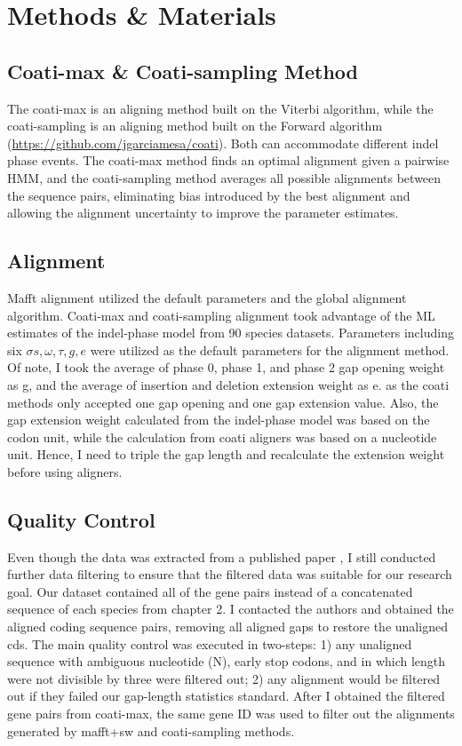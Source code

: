 \section{Methods \& Materials}
\subsection{Coati-max \& Coati-sampling Method}
The coati-max is an aligning method built on the Viterbi algorithm, while the coati-sampling is an aligning method built on the Forward algorithm (\href{https://github.com/jgarciamesa/coati}{https://github.com/jgarciamesa/coati}). Both can accommodate different indel phase events. The coati-max method finds an optimal alignment given a pairwise HMM, and the coati-sampling method averages all possible alignments between the sequence pairs, eliminating bias introduced by the best alignment and allowing the alignment uncertainty to improve the parameter estimates.  

\subsection{Alignment}
Mafft alignment utilized the default parameters and the global alignment algorithm. Coati-max and coati-sampling alignment took advantage of the ML estimates of the indel-phase model from 90 species datasets. Parameters including six $\sigma s, \omega, \tau, g, e$ were utilized as the default parameters for the alignment method. Of note, I took the average of phase 0, phase 1, and phase 2 gap opening weight as g, and the average of insertion and deletion extension weight as e. as the coati methods only accepted one gap opening and one gap extension value. Also, the gap extension weight calculated from the indel-phase model was based on the codon unit, while the calculation from coati aligners was based on a nucleotide unit. Hence, I need to triple the gap length and recalculate the extension weight before using aligners.   

\subsection{Quality Control}
Even though the data was extracted from a published paper \parencite{zou2021nonsynonymous}, I still conducted further data filtering to ensure that the filtered data was suitable for our research goal. Our dataset contained all of the gene pairs instead of a concatenated sequence of each species from chapter 2. I contacted the authors and obtained the aligned coding sequence pairs, removing all aligned gaps to restore the unaligned cds. The main quality control was executed in two-steps: 1) any unaligned sequence with ambiguous nucleotide (N), early stop codons, and in which length were not divisible by three were filtered out; 2) any alignment would be filtered out if they failed our gap-length statistics standard. After I obtained the filtered gene pairs from coati-max, the same gene ID was used to filter out the alignments generated by mafft+sw and coati-sampling methods. 

